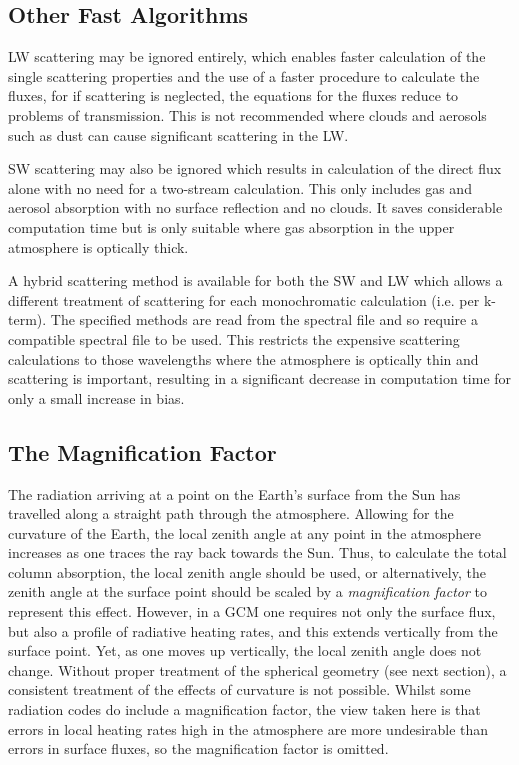 \subsection{Other Fast Algorithms}

LW scattering may be ignored entirely, which enables faster 
calculation of the single scattering properties and the use of a faster 
procedure to calculate the fluxes, for if scattering is neglected, the
equations for the fluxes reduce to problems of transmission. This is
not recommended where clouds and aerosols such as dust can cause
significant scattering in the LW.

SW scattering may also be ignored which results in calculation of the
direct flux alone with no need for a two-stream calculation. This only
includes gas and aerosol absorption with no surface reflection and no
clouds. It saves considerable computation time but is only suitable
where gas absorption in the upper atmosphere is optically thick.

A hybrid scattering method is available for both the SW and LW
which allows a different treatment of scattering for each
monochromatic calculation (i.e. per k-term). The specified methods are
read from the spectral file and so require a compatible spectral file
to be used. This restricts the expensive scattering calculations to
those wavelengths where the atmosphere is optically thin and scattering
is important, resulting in a significant decrease in computation time
for only a small increase in bias.


\subsection{The Magnification Factor}

The radiation arriving at a point on the Earth's surface from the Sun has
travelled along a straight path through the atmosphere. Allowing for the
curvature of the Earth, the local zenith angle at any point in the atmosphere
increases as one traces the ray back towards the Sun. Thus, to calculate
the total column absorption, the local zenith angle should be used, or
alternatively, the zenith angle at the surface point should be scaled by
a {\em magnification factor} to represent this effect. However, in a GCM
one requires not only the surface flux, but also a profile of radiative
heating rates, and this extends vertically from the surface point. Yet, as one
moves up vertically, the local zenith angle does not change. Without proper
treatment of the spherical geometry (see next section), a consistent treatment
of the effects of curvature is not possible. Whilst some radiation codes do
include a magnification factor, the view taken here is that errors in local
heating rates high in the atmosphere are more undesirable than errors in 
surface fluxes, so the magnification factor is omitted.


